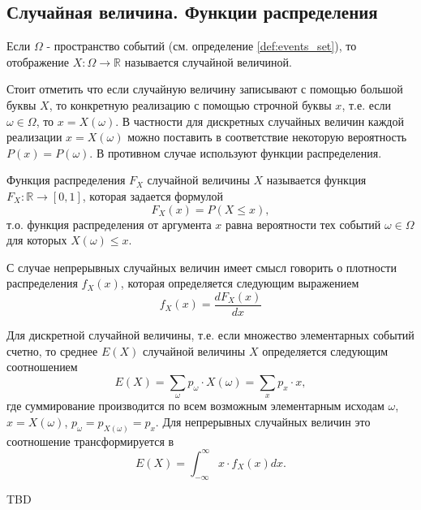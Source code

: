 \subsection{Случайная величина. Функции распределения}

\begin{definition}
\label{def:random_variable}
Если $\Omega$ - пространство событий (см. определение \autoref{def:events_set}), то 
отображение $X: \Omega \to \mathbb{R}$ называется случайной
величиной. 
\end{definition}

Стоит отметить что если случайную величину записывают с помощью
большой буквы $X$, то конкретную реализацию с помощью строчной буквы
$x$, т.е. если $\omega \in \Omega$, то $x = X(\omega)$. 
В частности для дискретных случайных величин каждой реализации
$x = X(\omega)$ можно поставить в соответствие некоторую вероятность
$P\left(x\right) = P\left(\omega\right)$. 
В противном случае используют функции распределения.

\begin{definition}
Функция распределения $F_X$ случайной величины $X$ называется функция
$F_X : \mathbb{R} \to [0,1]$, которая задается формулой
\[
F_X \left(x\right) = P\left(X \le x\right),
\]
т.о. функция распределения от аргумента $x$ равна вероятности тех
событий $\omega \in \Omega$ для которых
$X(\omega) \le x$.
\end{definition}

\begin{definition}
С случае непрерывных случайных величин имеет смысл говорить о
плотности распределения $f_X\left(x\right)$, 
которая определяется следующим выражением 
\[
f_X\left(x\right) = 
\frac{d F_X\left(x\right)}{d x}
\]
\end{definition}

\begin{definition}
Для дискретной случайной величины, т.е. если множество элементарных
событий счетно, то среднее $E\left(X\right)$ случайной величины $X$
определяется следующим соотношением
\[
E\left(X\right) = \sum_\omega p_\omega \cdot X(\omega) = 
\sum_x p_x \cdot x,
\] 
где суммирование производится по всем возможным элементарным исходам
$\omega$, $x = X(\omega)$, $p_\omega = p_{X(\omega)} = p_x$.
Для непрерывных случайных величин это соотношение трансформируется в 
\[
E\left(X\right) = \int_{-\infty}^\infty x \cdot f_X\left(x\right) dx.
\]
\end{definition}


TBD

